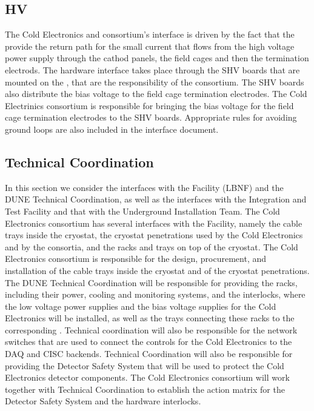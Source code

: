 \subsection{HV}
\label{sec:fdsp-tpcelec-interfaces-hv}

The Cold Electronics and  consortium's interface
is driven by the fact that the provide the return path for
the small current that flows from the high voltage power 
supply through the cathod panels, the field cages and then
the termination electrods. The hardware interface takes place through
the SHV boards that are mounted on the , that
are  the responsibility of the  consortium. The
SHV boards also distribute the bias voltage to the field
cage termination electrodes. The Cold  Electrinics consortium
is responsible for bringing the bias voltage for the field
cage termination electrodes to the SHV boards. Appropriate
rules for avoiding ground loops are also included in the 
interface document.

\subsection{Technical Coordination}
\label{sec:fdsp-tpcelec-interfaces-tc}

In this section we consider the interfaces with the Facility (LBNF)
and the DUNE Technical Coordination, as well as the interfaces with
the Integration and Test Facility and that with the Underground
Installation Team. The Cold Electronics consortium has several
interfaces with the Facility, namely the cable trays inside the
cryostat, the cryostat penetrations used by the Cold Electronics
and by the  consortia, and the racks and trays on top
of the cryostat. The Cold Electronics consortium is responsible
for the design, procurement, and installation of the cable trays
inside the cryostat and of the cryostat penetrations. The DUNE
Technical Coordination will be responsible for providing the racks,
including their power, cooling and monitoring systems, and the interlocks,
where the low voltage power supplies and the bias voltage supplies
for the Cold  Electronics will be installed, as well as the trays
connecting these racks to the corresponding . Technical
coordination will also be responsible for the network switches that
are used to connect the controls for the Cold Electronics to the
DAQ and CISC backends. Technical Coordination will also be responsible
for providing the Detector Safety System that will be used to protect
the Cold Electronics detector components. The Cold  Electronics
consortium will work together with Technical Coordination to establish
the action matrix for the Detector Safety System and the hardware
interlocks.

